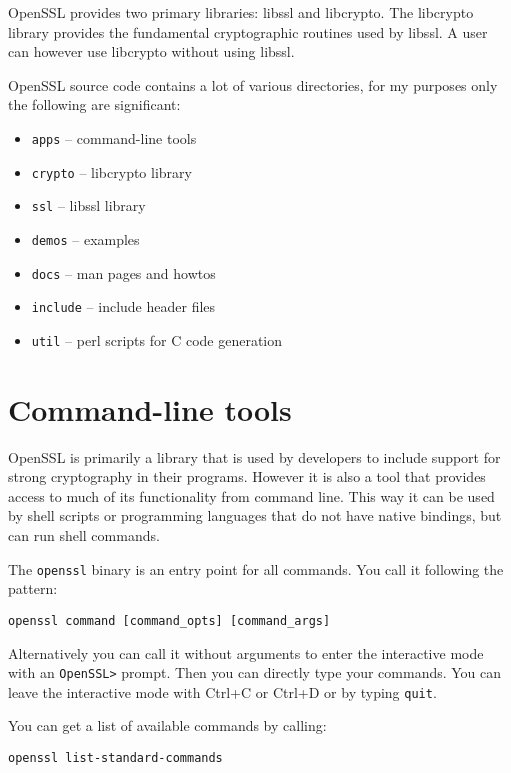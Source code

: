 OpenSSL provides two primary libraries: libssl and libcrypto. The libcrypto library provides the fundamental cryptographic routines used by libssl. A user can however use libcrypto without using libssl.

OpenSSL source code contains a lot of various directories, for my purposes only the following are significant:

\begin{itemize}
  \item \texttt{apps} -- command-line tools
  \item \texttt{crypto} -- libcrypto library
  \item \texttt{ssl} -- libssl library
  \item \texttt{demos} -- examples
  \item \texttt{docs} -- man pages and howtos
  \item \texttt{include} -- include header files
  \item \texttt{util} -- perl scripts for C code generation
\end{itemize}


\section{Command-line tools}

OpenSSL is primarily a library that is used by developers to include support for strong cryptography in their programs. However it is also a tool that provides access to much of its functionality from command line. This way it can be used by shell scripts or programming languages that do not have native bindings, but can run shell commands. \cite{viega2002network}

The \texttt{openssl} binary is an entry point for all commands. You call it following the pattern:

\begin{verbatim}
openssl command [command_opts] [command_args]
\end{verbatim}

Alternatively you can call it without arguments to enter the interactive mode with an \texttt{OpenSSL>} prompt. Then you can directly type your commands. You can leave the interactive mode with Ctrl+C or Ctrl+D or by typing \texttt{quit}.

You can get a list of available commands by calling:

\begin{verbatim}
openssl list-standard-commands
\end{verbatim}

